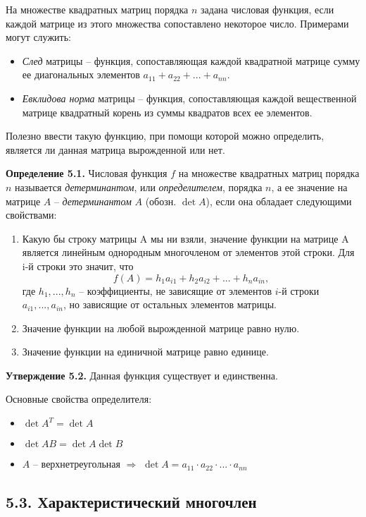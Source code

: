 \documentclass[a4paper, 12pt]{article}
\begin{document}
\begin{spacing}{1.5}
На множестве квадратных матриц порядка $n$ задана числовая функция, если каждой матрице из этого множества сопоставлено некоторое число. Примерами могут служить:
\begin{itemize} [noitemsep]
    \item \textit{След} матрицы -- функция, сопоставляющая каждой квадратной матрице сумму ее диагональных элементов $a_{11} + a_{22} + ... + a_{nn}$.
    \item \textit{Евклидова норма} матрицы -- функция, сопоставляющая каждой вещественной матрице квадратный корень из суммы квадратов всех ее элементов.
\end{itemize}
Полезно ввести такую функцию, при помощи которой можно определить, является ли данная матрица вырожденной или нет.

\textbf{Определение 5.1.} Числовая функция $f$ на множестве квадратных матриц порядка $n$ называется \textit{детерминантом}, или \textit{определителем}, порядка $n$, а ее значение на матрице
$A$ -- \textit{детерминантом} $A$ (обозн. $\det A$), если она обладает следующими свойствами:
\begin{enumerate} [noitemsep]
    \item Какую бы строку матрицы A мы ни взяли, значение функции на матрице A является линейным однородным многочленом от элементов этой строки. Для i-й строки это значит, что $$f(A) = h_1 a_{i1} + h_2 a_{i2} + ... + h_n a_{in},$$ где $h_1, ..., h_n$ -- коэффициенты, не зависящие от элементов $i$-й строки $a_{i1}, ... , a_{in}$, но зависящие от остальных элементов матрицы.
    \item Значение функции на любой вырожденной матрице равно нулю.
    \item Значение функции на единичной матрице равно единице.
\end{enumerate}

\textbf{Утверждение 5.2.} Данная функция существует и единственна.

Основные свойства определителя:
\begin{itemize} [noitemsep]
    \item $\det A^T = \det A$
    \item $\det AB = \det A \det B$
    \item $A$ -- верхнетреугольная $\Rightarrow$ $\det A = a_{11} \cdot a_{22} \cdot ... \cdot a_{nn}$
\end{itemize}

\subsection*{5.3. Характеристический многочлен}


\end{spacing}
\end{document}
